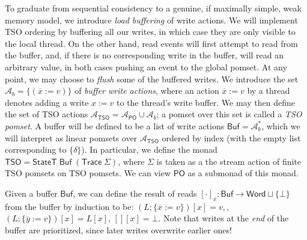 \documentclass[acmsmall,screen,review]{acmart}
\newcommand{\mc}[1]{\ensuremath{\mathcal{#1}}}
\newcommand{\ms}[1]{\ensuremath{\mathsf{#1}}}
\newcommand{\bufloc}[1]{\overline{#1}}
\begin{document}
To graduate from sequential consistency to a genuine, if maximally simple, weak memory model, we
introduce \textit{load buffering} of write actions. We will implement TSO ordering by buffering all
our writes, in which case they are only visible to the local thread. On the other hand, read events
will first attempt to read from the buffer, and, if there is no corresponding write in the buffer,
will read an arbitrary value, in both cases pushing an event to the global pomset. At any point, we
may choose to \textit{flush} some of the buffered writes. We introduce the set \(\mc{A}_b =
\{(\bufloc{x} := v)\}\) of \textit{buffer write actions}, where an action \(\bufloc{x} := v\) by a
thread denotes adding a write \(x := v\) to the thread's write buffer. We may then define the set of
TSO actions \(\mc{A}_{\ms{TSO}} = \mc{A}_{\ms{PO}} \cup \mc{A}_b\); a pomset over this set is called
a \emph{TSO pomset}. A buffer will be defined to be a list of write actions \(\ms{Buf} =
\mc{A}_b^*\), which we will interpret as linear pomsets over \(\mc{A}_{\ms{TSO}}\) ordered by index
(with the empty list corresponding to \(\{\delta\}\)). In particular, we define the monad \(\ms{TSO}
= \ms{StateT}\;\ms{Buf}\;(\ms{Trace}\;\Sigma)\), where \(\Sigma\) is taken as a the stream action of
finite TSO pomsets on TSO pomsets. We can view \(\ms{PO}\) as a submonad of this monad.

Given a buffer \(\ms{Buf}\), we can define the result of reads \([\cdot]_x: \ms{Buf} \to \ms{Word}
\sqcup \{\bot\}\) from the buffer by induction to be:
\(
  (L;\{\bufloc{x} := v\})[x] = v,
\),
\(
  (L;\{\bufloc{y} := v\})[x] = L[x]
\),
\(
  [][x] = \bot
\).
Note that writes at the \textit{end} of the buffer are prioritized, since later writes overwrite
earlier ones! 
\end{document}
